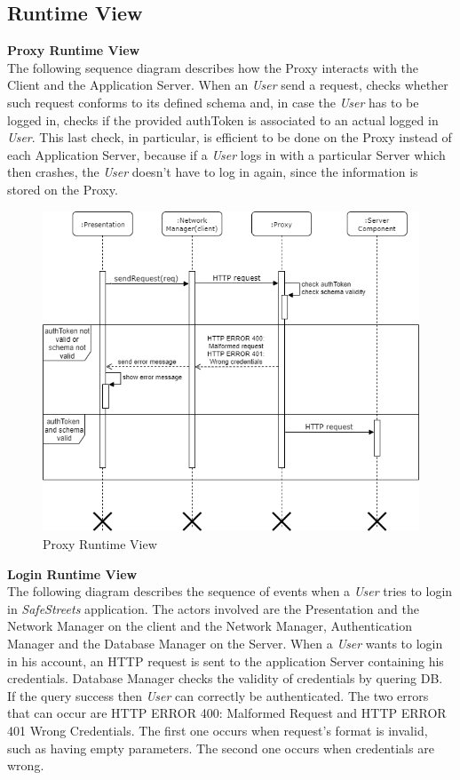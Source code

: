 \documentclass{article}
\begin{document}
\clearpage

\subsection{Runtime View}
\textbf{Proxy Runtime View}\\
The following sequence diagram describes how the Proxy interacts with the Client and the Application 
Server. When an \textit{User} send a request, checks whether such request conforms to its defined schema and, 
in case the \textit{User} has to be logged in, checks if the provided authToken is associated to an actual 
logged in \textit{User}. This last check, in particular, is efficient to be done on the Proxy instead of each 
Application Server, because if a \textit{User} logs in with a particular Server which then crashes, the 
\textit{User} doesn't have to log in again, since the information is stored on the Proxy. 

\begin{figure}[H]
    \centering
    \includegraphics[scale=0.4]{img/sequence_diagrams/Proxy_sequence.png}
    \caption{Proxy Runtime View}
\end{figure}  
\clearpage
\textbf{Login Runtime View}\\
The following diagram describes the sequence of events when a \textit{User} tries to login in 
\textit{SafeStreets} application. The actors involved are the Presentation and the Network Manager on the
client and the Network Manager, Authentication Manager and the Database Manager on the Server.
When a \textit{User} wants to login in his account, an HTTP request is sent to the application Server
containing his credentials. Database Manager checks the validity of credentials by quering DB. If the query
success then \textit{User} can correctly be authenticated. The two errors that can occur are HTTP ERROR 400:
Malformed Request and HTTP ERROR 401 Wrong Credentials. The first one occurs when request's format is invalid,
such as having empty parameters. The second one occurs when credentials are wrong.   
\end{document}
